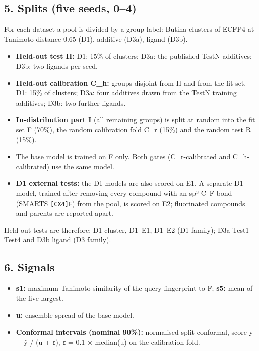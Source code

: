 \hypertarget{5-splits-five-seeds-04}{%
\subsection{5. Splits (five seeds, 0--4)}\label{5-splits-five-seeds-04}}

For each dataset a pool is divided by a group label: Butina clusters of
ECFP4 at Tanimoto distance 0.65 (D1), additive (D3a), ligand (D3b).

\begin{itemize}
\tightlist
\item
  \textbf{Held-out test H:} D1: 15\% of clusters; D3a: the published
  TestN additives; D3b: two ligands per seed.
\item
  \textbf{Held-out calibration C\_h:} groups disjoint from H and from
  the fit set. D1: 15\% of clusters; D3a: four additives drawn from the
  TestN training additives; D3b: two further ligands.
\item
  \textbf{In-distribution part I} (all remaining groups) is split at
  random into the fit set F (70\%), the random calibration fold C\_r
  (15\%) and the random test R (15\%).
\item
  The base model is trained on F only. Both gates (C\_r-calibrated and
  C\_h-calibrated) use the same model.
\item
  \textbf{D1 external tests:} the D1 models are also scored on E1. A
  separate D1 model, trained after removing every compound with an sp³
  C--F bond (SMARTS \texttt{{[}CX4{]}F}) from the pool, is scored on E2;
  fluorinated compounds and parents are reported apart.
\end{itemize}

Held-out tests are therefore: D1 cluster, D1--E1, D1--E2 (D1 family);
D3a Test1--Test4 and D3b ligand (D3 family).

\hypertarget{6-signals}{%
\subsection{6. Signals}\label{6-signals}}

\begin{itemize}
\tightlist
\item
  \textbf{s1:} maximum Tanimoto similarity of the query fingerprint to
  F; \textbf{s5:} mean of the five largest.
\item
  \textbf{u:} ensemble spread of the base model.
\item
  \textbf{Conformal intervals (nominal 90\%):} normalised split
  conformal, score \textbar y − ŷ\textbar{} / (u + ε), ε = 0.1 ×
  median(u) on the calibration fold.
\end{itemize}

